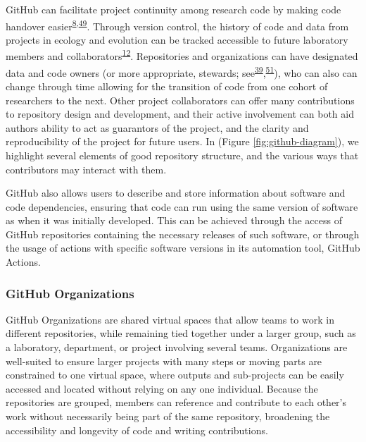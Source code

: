 GitHub can facilitate project continuity among research code by making code handover easier\textsuperscript{\protect\hyperlink{ref-4ny1onB0}{8},\protect\hyperlink{ref-D4C4k4ak}{49}}.
Through version control, the history of code and data from projects in ecology and evolution can be tracked accessible to future laboratory members and collaborators\textsuperscript{\protect\hyperlink{ref-3DKwn1sY}{12}}.
Repositories and organizations can have designated data and code owners (or more appropriate, stewards; see\textsuperscript{\protect\hyperlink{ref-iIEKCTLU}{39}},\textsuperscript{\protect\hyperlink{ref-s91uGRZ2}{51}}), who can also can change through time allowing for the transition of code from one cohort of researchers to the next.
Other project collaborators can offer many contributions to repository design and development, and their active involvement can both aid authors ability to act as guarantors of the project, and the clarity and reproducibility of the project for future users.
In (Figure \ref{fig:github-diagram}), we highlight several elements of good repository structure, and the various ways that contributors may interact with them.

GitHub also allows users to describe and store information about software and code dependencies, ensuring that code can run using the same version of software as when it was initially developed.
This can be achieved through the access of GitHub repositories containing the necessary releases of such software, or through the usage of actions with specific software versions in its automation tool, GitHub Actions.

\hypertarget{github-organizations}{%
\subsubsection{GitHub Organizations}\label{github-organizations}}

GitHub Organizations are shared virtual spaces that allow teams to work in different repositories, while remaining tied together under a larger group, such as a laboratory, department, or project involving several teams.
Organizations are well-suited to ensure larger projects with many steps or moving parts are constrained to one virtual space, where outputs and sub-projects can be easily accessed and located without relying on any one individual.
Because the repositories are grouped, members can reference and contribute to each other's work without necessarily being part of the same repository, broadening the accessibility and longevity of code and writing contributions.

